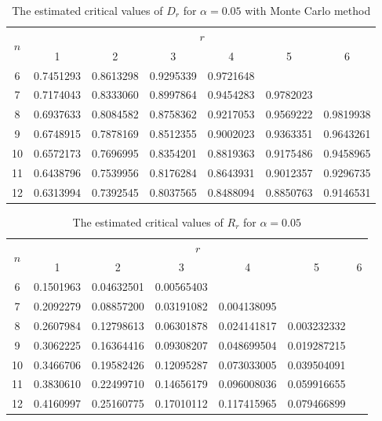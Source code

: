 \documentclass{report}
\begin{document}
\begin{table}[hbtp]
    \centering
    \caption{The estimated critical values of $D_r$ for $\alpha = 0.05$ with Monte Carlo method} \label{table: Dr critical values}
    \begin{tabular}{*{7}{c}}
        \toprule
        \multirow{2}{*}{$n$} & \multicolumn{6}{c}{$r$} \\
        \cline{2-7} 
                    & 1 & 2 & 3 & 4 & 5 & 6 \\
        \midrule
        6 & 0.7451293 & 0.8613298 & 0.9295339 & 0.9721648 &          &         \\
        7 & 0.7174043 & 0.8333060 & 0.8997864 & 0.9454283 & 0.9782023 &         \\
        8 & 0.6937633 & 0.8084582 & 0.8758362 & 0.9217053 & 0.9569222 & 0.9819938 \\
        9 & 0.6748915 & 0.7878169 & 0.8512355 & 0.9002023 & 0.9363351 & 0.9643261 \\
        10 & 0.6572173 & 0.7696995 & 0.8354201 & 0.8819363 & 0.9175486 & 0.9458965 \\
        11 & 0.6438796 & 0.7539956 & 0.8176284 & 0.8643931 & 0.9012357 & 0.9296735 \\
       12 & 0.6313994 & 0.7392545 & 0.8037565 & 0.8488094 & 0.8850763 & 0.9146531 \\
       \bottomrule 
    \end{tabular}
\end{table}

\begin{table}[hbtp]
    \centering
    \caption{The estimated critical values of $ R_r$ for $\alpha = 0.05$} \label{table: Rk critical values}
    \begin{tabular}{*{7}{c}}
        \toprule
        \multirow{2}{*}{$n$} & \multicolumn{6}{c}{$r$} \\
        \cline{2-7} 
        & 1 & 2 & 3 & 4 & 5 & 6 \\
        \midrule
        6 & 0.1501963 & 0.04632501 & 0.00565403 &             &          \\ 
        7 & 0.2092279 & 0.08857200 & 0.03191082 & 0.004138095 &          \\ 
        8 & 0.2607984 & 0.12798613 & 0.06301878 & 0.024141817 & 0.003232332 \\
        9 & 0.3062225 & 0.16364416 & 0.09308207 & 0.048699504 & 0.019287215 \\
       10 & 0.3466706 & 0.19582426 & 0.12095287 & 0.073033005 & 0.039504091 \\
       11 & 0.3830610 & 0.22499710 & 0.14656179 & 0.096008036 & 0.059916655 \\
       12 & 0.4160997 & 0.25160775 & 0.17010112 & 0.117415965 & 0.079466899 \\
       \bottomrule 
    \end{tabular}
\end{table}
\end{document}
